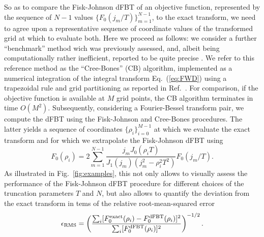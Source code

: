 \documentclass[12pt]{iopart}
\begin{document}
So as to compare the Fisk-Johnson dFBT of an objective function, represented by
the sequence of $N-1$ values $\{F_0(j_m/T)\}_{m=1}^{N-1}$, to the exact
transform, we need to agree upon a representative sequence of coordinate values
of the transformed grid at which to evaluate both. Here we proceed as follows:
we consider a further ``benchmark'' method wich was previously assessed, and,
albeit being computationally rather inefficient, reported to be quite precise
\cite{Cree:1993}. We refer to this reference method as the ``Cree-Bones''
(CB) algorithm, implemented as a numerical integration of the integral transform
Eq.~(\ref{eq:FWD}) using a trapezoidal rule and grid partitioning as reported
in Ref.~\cite{Cree:1993}. For comparison, if the objective function is
available at $M$ grid points, the CB algorithm terminates in time $O(M^2)$.
Subsequently, considering a Fourier-Bessel transform pair, we
compute the dFBT using the Fisk-Johnson and Cree-Bones procedures. The latter
yields a sequence of coordinates $\{\rho_i\}_{i=0}^{M-1}$ at which we 
evaluate the exact transform and for which we extrapolate the Fisk-Johnson 
dFBT using \cite{FiskJohnson:1987}
\begin{equation}
F_0(\rho_i) = 2 \sum_{m=1}^{N-1} \frac{j_m J_0(\rho_i T)}{J_1(j_m)(j_m^2-\rho_i^2 T^2)} F_0(j_m/T). \label{eq:extrapolation}
\end{equation}
As illustrated in Fig.~\ref{fig:examples}, this not only allows to visually
assess the performance of the Fisk-Johnson dFBT procedure for different choices
of the truncation parameters $T$ and $N$, but also allows to quantify the 
deviation from the exact transform in tems of the relative root-mean-squared 
error
\begin{equation}
\epsilon_{\rm RMS} = \left( \frac{\sum_i [F_0^{\rm{exact}}(\rho_i) - F_0^{\rm dFBT}(\rho_i)]^2}{\sum_i [F_0^{\rm dFBT}(\rho_i)]^2} \right)^{-1/2}. \label{eq:rms}
\end{equation}
\end{document}
